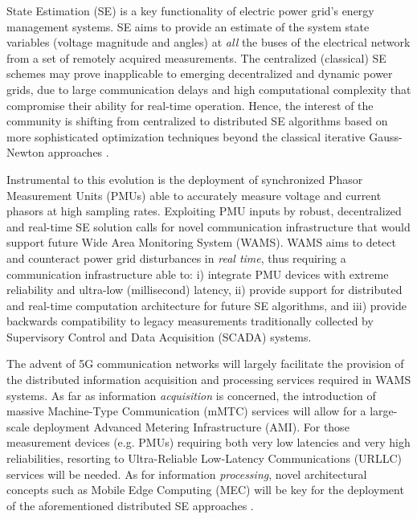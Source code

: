\documentclass[journal]{IEEEtran}
\begin{document}
State Estimation (SE) is a key functionality of electric power grid's energy management systems. SE aims to provide an estimate of the system state variables (voltage magnitude and angles) at \emph{all} the buses of the electrical network from a set of remotely acquired measurements. The centralized (classical) SE schemes may prove inapplicable to emerging decentralized and dynamic power grids, due to large communication delays and high computational complexity that compromise their ability for real-time operation. Hence, the interest of the community is shifting from centralized to distributed SE algorithms based on more sophisticated optimization techniques beyond the classical iterative Gauss-Newton approaches \cite{exposito}. 

Instrumental to this evolution is the deployment of synchronized Phasor Measurement Units (PMUs) able to accurately measure voltage and current phasors at high sampling rates. Exploiting PMU inputs by robust, decentralized and real-time SE solution calls for novel communication infrastructure that would support future Wide Area Monitoring System (WAMS). WAMS aims to detect and counteract power grid disturbances in \emph{real time}, thus requiring a communication infrastructure able to: i) integrate PMU devices with extreme reliability and ultra-low (millisecond) latency, ii) provide support for distributed and real-time computation architecture for future SE algorithms, and iii) provide backwards compatibility to legacy measurements traditionally collected by Supervisory Control and Data Acquisition (SCADA) systems.

The advent of 5G communication networks will largely facilitate the provision of the distributed information acquisition and processing services required in WAMS systems. As far as information \emph{acquisition} is concerned, the introduction of massive Machine-Type Communication (mMTC) services will allow for a large-scale deployment Advanced Metering Infrastructure (AMI). For those measurement devices (e.g. PMUs) requiring both very low latencies and very high reliabilities, resorting to Ultra-Reliable Low-Latency Communications (URLLC) services \cite{ghosh} will be needed. As for information \emph{processing}, novel architectural concepts such as Mobile Edge Computing (MEC) will be key for the deployment of the aforementioned distributed SE approaches \cite{young}. 
\end{document}

